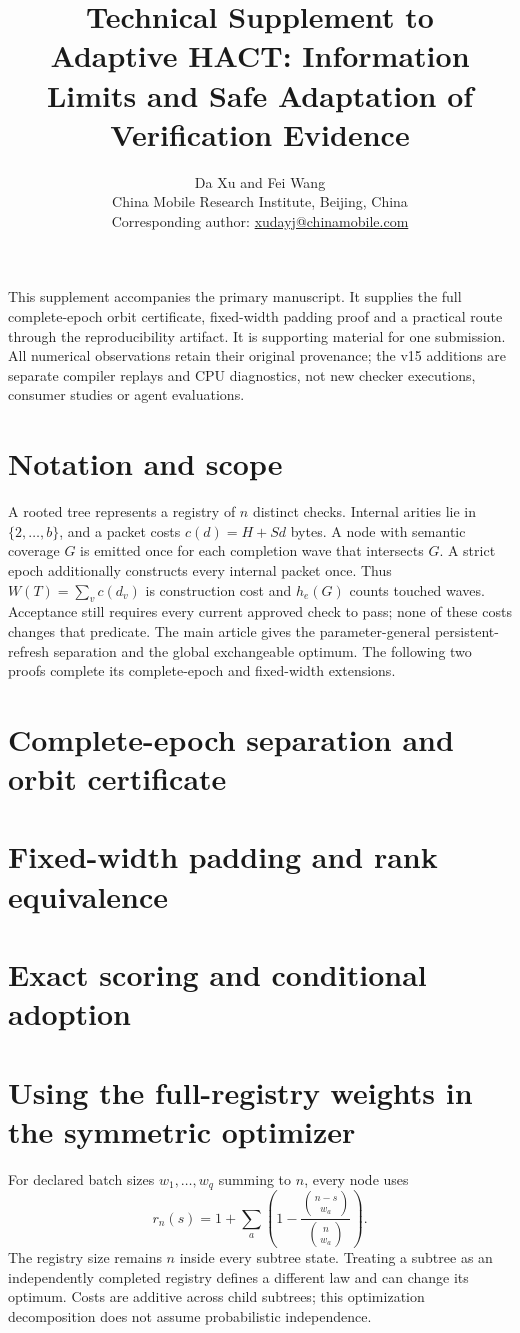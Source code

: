 \documentclass[10pt,letterpaper]{article}
\title{Technical Supplement to\\Adaptive HACT: Information Limits and Safe Adaptation of Verification Evidence}
\author{Da Xu and Fei Wang\\China Mobile Research Institute, Beijing, China\\
\small Corresponding author: \href{mailto:xudayj@chinamobile.com}{xudayj@chinamobile.com}}
\date{}
\begin{document}
\maketitle
This supplement accompanies the primary manuscript. It supplies the full
complete-epoch orbit certificate, fixed-width padding proof and a practical
route through the reproducibility artifact. It is supporting material for
one submission. All numerical observations retain their original provenance;
the v15 additions are separate compiler replays and CPU diagnostics, not new
checker executions, consumer studies or agent evaluations.

\section{Notation and scope}
A rooted tree represents a registry of $n$ distinct checks. Internal arities
lie in $\{2,\ldots,b\}$, and a packet costs $c(d)=H+Sd$ bytes.
A node with semantic coverage $G$ is emitted once for each completion wave
that intersects $G$. A strict epoch additionally constructs every internal
packet once. Thus $W(T)=\sum_v c(d_v)$ is construction cost and
$h_e(G)$ counts touched waves. Acceptance still requires every current
approved check to pass; none of these costs changes that predicate.
The main article gives the parameter-general persistent-refresh separation
and the global exchangeable optimum. The following two proofs complete its
complete-epoch and fixed-width extensions.

\section{Complete-epoch separation and orbit certificate}



\section{Fixed-width padding and rank equivalence}


\section{Exact scoring and conditional adoption}



\section{Using the full-registry weights in the symmetric optimizer}
For declared batch sizes $w_1,\ldots,w_q$ summing to $n$, every node uses
\[
r_n(s)=1+\sum_a\left(1-\frac{\binom{n-s}{w_a}}{\binom n{w_a}}\right).
\]
The registry size remains $n$ inside every subtree state. Treating a subtree
as an independently completed registry defines a different law and can
change its optimum. Costs are additive across child subtrees; this
optimization decomposition does not assume probabilistic independence.
\end{document}
